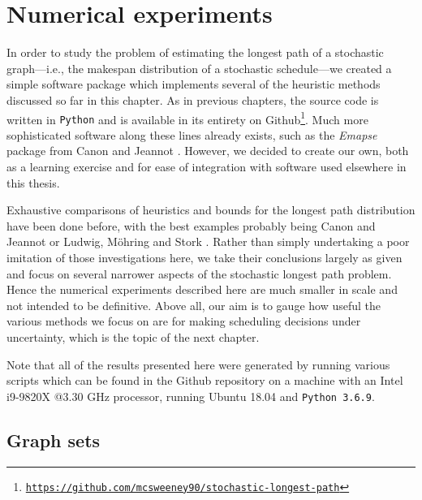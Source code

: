 \documentclass[12pt]{article}
\begin{document}
\section{Numerical experiments}
\label{sect.results}

In order to study the problem of estimating the longest path of a stochastic graph---i.e., the makespan distribution of a stochastic schedule---we created a simple software package which implements several of the heuristic methods discussed so far in this chapter. As in previous chapters, the source code is written in {\tt Python} and is available in its entirety on Github\footnote{\href{https://github.com/mcsweeney90/stochastic-longest-path}{{\tt \small https://github.com/mcsweeney90/stochastic-longest-path}}}. Much more sophisticated software along these lines already exists, such as the {\em Emapse} package from Canon and Jeannot \cite{can16}. However, we decided to create our own, both as a learning exercise and for ease of integration with software used elsewhere in this thesis. 

Exhaustive comparisons of heuristics and bounds for the longest path distribution have been done before, with the best examples probably being Canon and Jeannot \cite{can16} or Ludwig, M{\"o}hring and Stork \cite{lud01}. Rather than simply undertaking a poor imitation of those investigations here, we take their conclusions largely as given and focus on several narrower aspects of the stochastic longest path problem. Hence the numerical experiments described here are much smaller in scale and not intended to be definitive. Above all, our aim is to gauge how useful the various methods we focus on are for making scheduling decisions under uncertainty, which is the topic of the next chapter.

Note that all of the results presented here were generated by running various scripts which can be found in the Github repository on a machine with an Intel i9-9820X @3.30 GHz processor, running Ubuntu 18.04 and {\tt Python 3.6.9}. 

\subsection{Graph sets}
\label{subsect.graphs}
\end{document}

